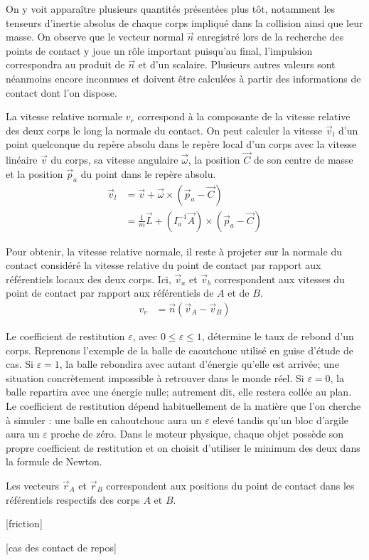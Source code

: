 On y voit apparaître plusieurs quantités présentées plus tôt,
notamment les tenseurs d'inertie absolus de chaque corps impliqué dans
la collision ainsi que leur masse. On observe que le vecteur normal
$\vec{n}$ enregistré lors de la recherche des points de contact y joue
un rôle important puisqu'au final, l'impulsion correspondra au produit
de $\vec{n}$ et d'un scalaire. Plusieurs autres valeurs sont néanmoins
encore inconnues et doivent être calculées à partir des informations
de contact dont l'on dispose.

La vitesse relative normale $v_r$ correspond à la composante de la
vitesse relative des deux corps le long la normale du contact. On peut
calculer la vitesse $\vec{v}_l$ d'un point quelconque du repère absolu
dans le repère local d'un corps avec la vitesse linéaire $\vec{v}$ du
corps, sa vitesse angulaire $\vec{\omega}$, la position $\vec{C}$ de
son centre de masse et la position $\vec{p}_a$ du point dans le repère
absolu.
\begin{align*}
  \vec{v}_l &= \vec{v} + \vec{\omega} \times (\vec{p}_a - \vec{C}) \\
            &= \frac{1}{m} \vec{L} + (I^{-1}_a \vec{A}) \times (\vec{p}_a - \vec{C})
\end{align*}

Pour obtenir, la vitesse relative normale, il reste à projeter sur la
normale du contact considéré la vitesse relative du point de contact
par rapport aux référentiels locaux des deux corps. Ici, $\vec{v}_a$
et $\vec{v}_b$ correspondent aux vitesses du point de contact par
rapport aux référentiels de $A$ et de $B$.
\begin{align*}
  v_r &= \vec{n} (\vec{v}_{A} - \vec{v}_{B})
\end{align*}

Le coefficient de restitution $\varepsilon$, avec $0 \leq \varepsilon
\leq 1$, détermine le taux de rebond d'un corps. Reprenons l'exemple
de la balle de caoutchouc utilisé en guise d'étude de cas. Si
$\varepsilon = 1$, la balle rebondira avec autant d'énergie qu'elle
est arrivée; une situation concrètement impossible à retrouver dans le
monde réel. Si $\varepsilon = 0$, la balle repartira avec une énergie
nulle; autrement dit, elle restera collée au plan. Le coefficient de
restitution dépend habituellement de la matière que l'on cherche à
simuler : une balle en cahoutchouc aura un $\varepsilon$ elevé tandis
qu'un bloc d'argile aura un $\varepsilon$ proche de zéro. Dans le
moteur physique, chaque objet possède son propre coefficient de
restitution et on choisit d'utiliser le minimum des deux dans la
formule de Newton.

Les vecteurs $\vec{r}_A$ et $\vec{r}_B$ correspondent aux positions du
point de contact dans les référentiels respectifs des corps $A$ et $B$.



[friction]

[cas des contact de repos]


